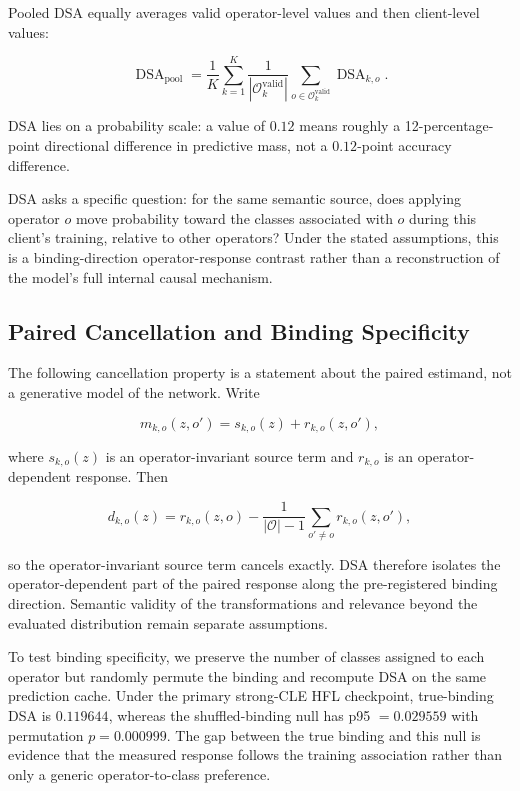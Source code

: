 Pooled DSA equally averages valid operator-level values and then client-level values:

\[
\operatorname{DSA}_{\mathrm{pool}}
=\frac1K\sum_{k=1}^{K}
\frac1{|\mathcal O_k^{\mathrm{valid}}|}
\sum_{o\in\mathcal O_k^{\mathrm{valid}}}\operatorname{DSA}_{k,o}.
\]

DSA lies on a probability scale: a value of \(0.12\) means roughly a 12-percentage-point directional difference in predictive mass, not a \(0.12\)-point accuracy difference.

DSA asks a specific question: for the same semantic source, does applying operator \(o\) move probability toward the classes associated with \(o\) during this client's training, relative to other operators? Under the stated assumptions, this is a binding-direction operator-response contrast rather than a reconstruction of the model's full internal causal mechanism.

\subsection{Paired Cancellation and Binding Specificity}

The following cancellation property is a statement about the paired estimand, not a generative model of the network. Write

\[
m_{k,o}(z,o')=s_{k,o}(z)+r_{k,o}(z,o'),
\]

where \(s_{k,o}(z)\) is an operator-invariant source term and \(r_{k,o}\) is an operator-dependent response. Then

\[
d_{k,o}(z)=r_{k,o}(z,o)
-\frac{1}{|\mathcal O|-1}\sum_{o'\neq o}r_{k,o}(z,o'),
\]

so the operator-invariant source term cancels exactly. DSA therefore isolates the operator-dependent part of the paired response along the pre-registered binding direction. Semantic validity of the transformations and relevance beyond the evaluated distribution remain separate assumptions.

To test binding specificity, we preserve the number of classes assigned to each operator but randomly permute the binding and recompute DSA on the same prediction cache. Under the primary strong-CLE HFL checkpoint, true-binding DSA is \(0.119644\), whereas the shuffled-binding null has p95 \(=0.029559\) with permutation \(p=0.000999\). The gap between the true binding and this null is evidence that the measured response follows the training association rather than only a generic operator-to-class preference.

